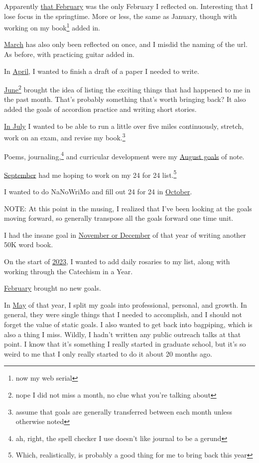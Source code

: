 \documentclass[12pt]{article}[titlepage]
\renewcommand{\,}{\textsuperscript{,}}
\begin{document}
Apparently \href{reflection-february-22}{that February} was the only February I reflected on.  
Interesting that I lose focus in the springtime.  
More or less, the same as January, though with working on my book\footnote{now my web serial} added in.

\href{reflection-march-2022}{March} has also only been reflected on once, and I misdid the naming of the url.  
As before, with practicing guitar added in.

In \href{reflection-april-2022}{April}, I wanted to finish a draft of a paper I needed to write.

\href{reflection-june-2022}{June}\footnote{nope I did not miss a month, no clue what you're talking about} brought the idea of listing the exciting things that had happened to me in the past month.  
That's probably something that's worth bringing back?  
It also added the goals of accordion practice and writing short stories.

\href{reflection-july-2022}{In July} I wanted to be able to run a little over five miles continuously, stretch, work on an exam, and revise my book.\footnote{assume that goals are generally transferred between each month unless otherwise noted}

Poems, journaling,\footnote{ah, right, the spell checker I use doesn't like journal to be a gerund} and curricular development were my \href{reflection-august-2022}{August goals} of note.

\href{reflection-september-2022}{September} had me hoping to work on my 24 for 24 list.\footnote{Which, realistically, is probably a good thing for me to bring back this year}

I wanted to do NaNoWriMo and fill out 24 for 24 in \href{reflection-october-24}{October}.

NOTE: At this point in the musing, I realized that I've been looking at the goals moving forward, so generally transpose all the goals forward one time unit.

I had the insane goal in \href{reflection-november-24}{November or December} of that year of writing another 50K word book.

On the start of \href{reflection-2022}{2023}, I wanted to add daily rosaries to my list, along with working through the Catechism in a Year.

\href{reflection-january-23}{February} brought no new goals.

In \href{reflection-april-23}{May} of that year, I split my goals into professional, personal, and growth.  
In general, they were single things that I needed to accomplish, and I should not forget the value of static goals.  
I also wanted to get back into bagpiping, which is also a thing I miss.  
Wildly, I hadn't written any public outreach talks at that point.  
I know that it's something I really started in graduate school, but it's so weird to me that I only really started to do it about 20 months ago.
\end{document}
